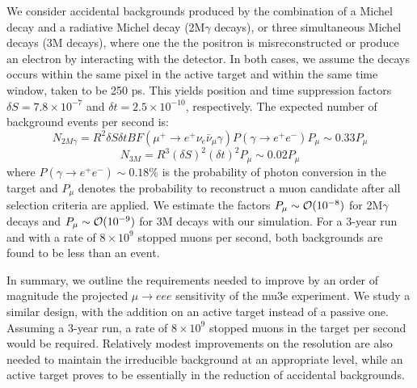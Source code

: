 We consider accidental backgrounds produced by the combination of a Michel decay and a radiative Michel decay (2M$\gamma$ decays), or three simultaneous Michel decays (3M decays), where one the the positron is misreconstructed or produce an electron by interacting with the detector. In both cases, we assume 
the decays occurs within the same pixel in the active target and within the same time window, taken to be 250 ps. This yields position and time suppression factors $\delta S = 7.8\times 10^{-7}$ and $\delta t = 2.5\times 10^{-10}$, respectively. The expected number of background events per second is:
%
$$N_{2M\gamma} = R^2 \delta S \delta t BF(\mu^+ \rightarrow e^+ \nu_e \bar\nu_\mu \gamma) P(\gamma \rightarrow e^+ e^-)  P_\mu  \sim 0.33 P_\mu$$
$$N_{3M} = R^3(\delta S)^2 (\delta t)^2 P_\mu \sim 0.02 P_\mu$$
%
where $P(\gamma \rightarrow e^+ e^-)\sim 0.18\%$ is the probability of photon conversion in the target and $P_\mu$ denotes the probability to reconstruct a muon candidate after all selection criteria are applied. We estimate the factors $P_\mu \sim {\cal O}(10^{-8})$ for 2M$\gamma$ decays and $P_\mu \sim {\cal O}(10^{-9})$ for 3M decays with our simulation. For a 3-year run and with a rate of $8\times 10^{9}$ stopped muons per second, both backgrounds are found to be less than an event.

In summary, we outline the requirements needed to improve by an order of magnitude the projected $\mu \rightarrow eee$ 
sensitivity of the mu3e experiment. We study a similar design, with the addition on an active target instead of a passive one. Assuming a 3-year run, a rate of $8\times 10^{9}$ stopped muons in the target per second would be required. Relatively modest improvements on the resolution are also needed to maintain the irreducible background at an appropriate level, while an active target proves to be essentially in the reduction of accidental 
backgrounds. 







